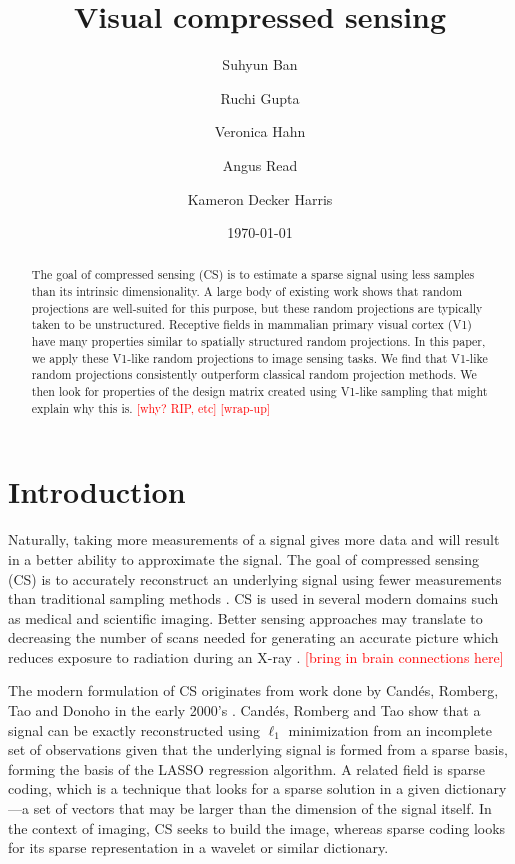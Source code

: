 \documentclass{article}
\title{Visual compressed sensing}
\author[1,*]{Suhyun Ban}
\author[1,*]{Ruchi Gupta}
\author[1,*]{Veronica Hahn}
\author[1,*]{Angus Read}
\author[1,**]{Kameron Decker Harris}
\affil[1]{Western Washington University, Department of Computer Science}
\affil[*]{Alphabetical order}
\affil[**]{Corresponding author: \href{mailto:kameron.harris@wwu.edu}{kameron.harris@wwu.edu}}
\date{\today}
\newcommand{\todo}[1]{\textcolor{red}{[#1]}}
\begin{document}
\maketitle

\begin{abstract}
  The goal of compressed sensing (CS) is to estimate a sparse signal using less samples than its intrinsic dimensionality.
  A large body of existing work shows that random projections are well-suited for this purpose, but these random projections are typically taken to be unstructured.
  Receptive fields in mammalian primary visual cortex (V1) have many properties similar to spatially structured random projections.
  In this paper, we apply these V1-like random projections to image sensing tasks.
  We find that V1-like random projections consistently outperform classical random projection methods. 
  We then look for properties of the design matrix created using V1-like sampling that might explain why this is.
  \todo{why? RIP, etc}
  \todo{wrap-up}
\end{abstract}


\section{Introduction}


Naturally, taking more measurements of a signal gives more data and will result in a better ability to approximate the signal.
The goal of compressed sensing (CS) is to accurately reconstruct an underlying signal using fewer measurements than traditional sampling methods \cite{foucartMathematicalIntroductionCompressive2013, raniSystematicReviewCompressive2018}.
CS is used in several modern domains such as medical and scientific imaging.
Better sensing approaches may translate to decreasing the number of scans needed for generating an accurate picture which reduces exposure to radiation during an X-ray \cite{graffCompressiveSensingMedical2015}.
\todo{bring in brain connections here}

The modern formulation of CS originates from work done by Cand\'es, Romberg, Tao and Donoho in the early 2000's \cite{candesRobustUncertaintyPrinciples2004a, candesOptimalSignalRecovery2006, donohoCompressedSensing2006}.
Cand\'es, Romberg and Tao show that a signal can be exactly reconstructed using $\ell_1$ minimization from an incomplete set of observations given that the underlying signal is formed from a sparse basis, forming the basis of the LASSO regression algorithm.
A related field is sparse coding, which is a technique that looks for a sparse solution in a given dictionary---a set of vectors that may be larger than the dimension of the signal itself.
In the context of imaging, CS seeks to build the image, whereas sparse coding looks for its sparse representation in a wavelet or similar dictionary.
\end{document}
